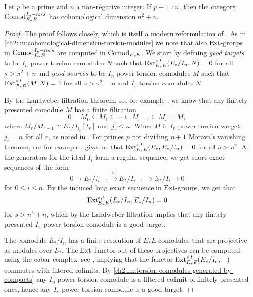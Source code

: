 \begin{lemma}
    \label{ch2:lm:cohomological-dimension-torsion-comodules}
    Let $p$ be a prime and $n$ a non-negative integer. If $p-1\nmid n$, then the category $\mathrm{Comod}_{E_*E}^{I_n-tors}$ has cohomological dimension $n^2+n$. 
\end{lemma}
\begin{proof}
    The proof follows \cite[2.5]{pstragowski_2021} closely, which is itself a modern reformulation of \cite[3.4.3.9]{franke_96}. As in \cref{ch2:lm:cohomological-dimension-torsion-modules} we note that also $\operatorname{Ext}$-groups in $\mathrm{Comod}_{E_*E}^{I_n-tors}$ are computed in $\mathrm{Comod}_{E_*E}$. We start by defining \emph{good targets} to be $I_n$-power torsion comodules $N$ such that $\operatorname{Ext}_{E_*E}^{s,t}(E_*/I_n, N)=0$ for all $s>n^2+n$ and \emph{good sources} to be $I_n$-power torsion comodules $M$ such that $\operatorname{Ext}_{E_*E}^{s,t}(M,N)=0$ for all $s>n^2+n$ and $I_n$-torsion comodules $N$. 

    By the Landweber filtration theorem, see for example \cite[5.7]{hovey-strickland_2005a}, we know that any finitely presented comodule $M$ has a finite filtration 
    $$0=M_0 \subseteq M_1 \subseteq \cdots \subseteq M_{s-1}\subseteq M_s=M,$$
    where $M_r/M_{r-1} \cong E_*/I_{j_r}[t_r]$ and $j_r\leq n$. When $M$ is $I_n$-power torsion we get $j_r=n$ for all $r$, as noted in \cite[4.3]{hovey-strickland_2005a}. For primes $p$ not dividing $n+1$ Morava's vanishing theorem, see for example \cite[6.2.10]{ravenel_86}, gives us that $\operatorname{Ext}_{E_*E}^{s,t}(E_*, E_*/I_n) = 0$ for all $s>n^2$. As the generators for the ideal $I_i$ form a regular sequence, we get short exact sequences of the form 
    \[0\longrightarrow E_*/I_{i-1} \overset{v_i}\longrightarrow E_*/I_{i-1} \longrightarrow E_*/I_i\longrightarrow 0\]
    for $0\leq i\leq n$. By the induced long exact sequence in $\operatorname{Ext}$-groups, we get that 
    \[\operatorname{Ext}_{E_*E}^{s,t}(E_*/I_n, E_*/I_n) = 0\] 
    for $s>n^2+n$, which by the Landweber filtration implies that any finitely presented $I_n$-power torsion comodule is a good target.
    
    The comodule $E_*/I_n$ has a finite resolution of $E_*E$-comodules that are projective as modules over $E_*$. The $\operatorname{Ext}$-functor out of these projectives can be computed using the cobar complex, see \cite[A1.2.12]{ravenel_86}, implying that the functor $\operatorname{Ext}_{E_*E}^{s,t}(E_*/I_n, -)$ commutes with filtered colimits. By \cref{ch2:lm:torsion-comodules-generated-by-compacts} any $I_n$-power torsion comodule is a filtered colimit of finitely presented ones, hence any $I_n$-power torsion comodule is a good target. 


\end{proof}

